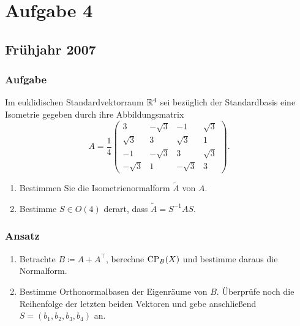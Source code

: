 \chapter{Aufgabe 4}

\section{Frühjahr 2007}

\subsection{Aufgabe}
Im euklidischen Standardvektorraum \( \mathbb{R}^4 \) sei bezüglich der Standardbasis eine Isometrie gegeben durch ihre Abbildungsmatrix
\begin{equation*}
	A = \frac{1}{4}\begin{pmatrix}
		3 & - \sqrt{3} & -1 & \sqrt{3} \\
		\sqrt{3} & 3 & \sqrt{3} & 1 \\
		-1 & -\sqrt{3} & 3 & \sqrt{3} \\
		-\sqrt{3} & 1 & -\sqrt{3} & 3
	\end{pmatrix}\text{.}
\end{equation*}
\begin{enumerate}
	\item Bestimmen Sie die Isometrienormalform \( \widetilde{A} \) von \( A \).
	\item Bestimme \( S \in O(4) \) derart, dass \( \widetilde{A} = S^{-1}AS \).
\end{enumerate}

\subsection{Ansatz}
\begin{enumerate}
	\item Betrachte \( B \coloneqq A + A^\top \), berechne \( \text{CP}_B(X) \) und bestimme daraus die Normalform.
	\item Bestimme Orthonormalbasen der Eigenräume von \( B \). Überprüfe noch die Reihenfolge der letzten beiden Vektoren und gebe anschließend \( S=(b_1,b_2,b_3,b_4) \) an.
\end{enumerate}

